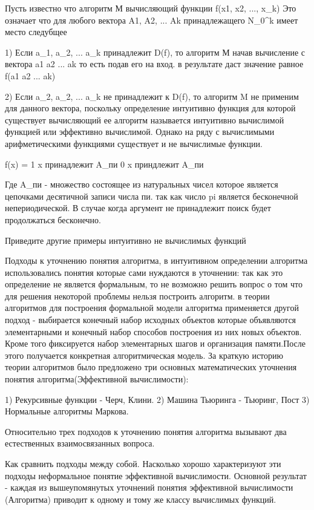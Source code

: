 Пусть известно что алгоритм М вычисляющий функции f(x1, x2, ..., x_k) Это означает что для любого вектора A1, A2, ... Ak принадлежащего N_0^k имеет место следубщее

1) Если a_1, a_2, ... a_k принадлежит D(f), то алгоритм М начав вычисление с вектора a1 a2 ... ak то есть подав его на вход. в результате даст значение равное f(a1 a2 ... ak)

2) Если a_2, a_2, ... a_k не принадлежит к D(f), то алгоритм M не применим для данного вектора, поскольку определение интуитивно функция для которой существует вычисляющий ее алгоритм называется интуитивно вычислимой функцией или эффективно вычислимой. Однако на ряду с вычислимыми арифметическими функциями существует и не вычислимые функции.

f(x) =  1 x принадлежит A_пи
        0 x приндлежит A_пи

        Где A_пи - множество состоящее из натуральных чисел которое является цепочками десятичной записи числа пи. так как число pi является бесконечной непериодической. В случае когда аргумент не принадлежит поиск будет продолжаться бесконечно.

Приведите другие примеры интуитивно не вычислимых функций

Подходы  к уточнению понятия алгоритма, в интуитивном определении алгоритма использовались понятия которые сами нуждаются в уточнении: так как это определение не является формальным, то не возможно решить вопрос о том что для решения некоторой проблемы нельзя построить алгоритм. в теории алгоритмов для построения формальной модели алгоритма применяется другой подход - выбирается конечный набор исходных объектов которые объявляются элементарными и конечный набор способов построения из них новых объектов. Кроме того фиксируется набор элементарных шагов и организация памяти.После этого получается конкретная алгоритмическая модель. За краткую историю теории алгоритмов было предложено три основных математических уточнения понятия алгоритма(Эффективной вычислимости):


1) Рекурсивные функции - Черч, Клини.
2) Машина Тьюринга - Тьюринг, Пост
3) Нормальные алгоритмы Маркова.

Относительно трех подходов к уточнению понятия алгоритма вызывают два естественных взаимосвязанных вопроса.

Как сравнить подходы между собой.
Насколько хорошо характеризуют эти подходы неформальное понятие эффективной вычислимости.
Основной результат - каждая из вышеупомянутых уточнений понятия эффективной вычислимости (Алгоритма) приводит к одному и тому же классу вычислимых функций.

